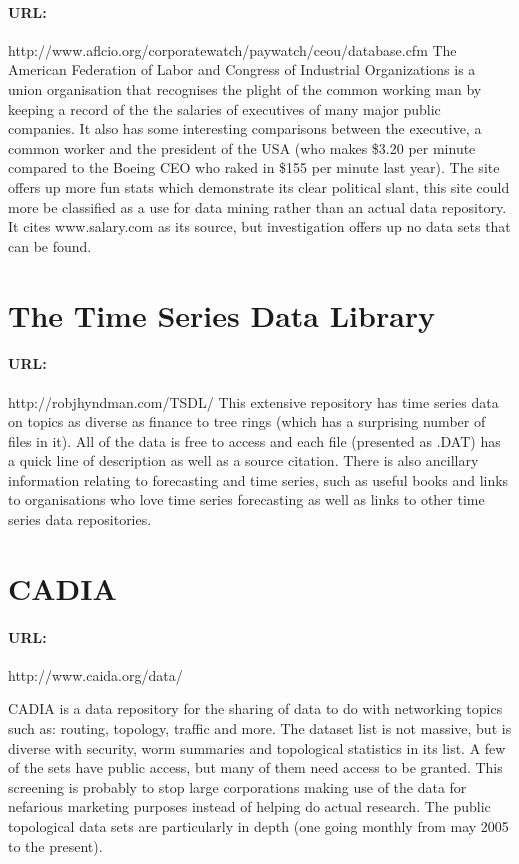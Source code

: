 \documentclass[10pt]{article}
\begin{document}
     \paragraph{URL:} http://www.aflcio.org/corporatewatch/paywatch/ceou/database.cfm\newline
     The American Federation of Labor and Congress of Industrial Organizations is a
     union organisation that recognises the plight of the common working man by keeping
     a record of the the salaries of executives of many major public companies.
     It also has some interesting comparisons between the executive, a common worker and
     the president of the USA (who makes \$3.20 per minute compared to the Boeing CEO 
     who raked in \$155 per minute last year). The site offers up more fun stats which
     demonstrate its clear political slant, this site could more be classified as a use      for data mining rather than an actual data repository. It cites www.salary.com as
     its source, but investigation offers up no data sets that can be found. 

  \section{The Time Series Data Library}
     \paragraph{URL:} http://robjhyndman.com/TSDL/\newline
     This extensive repository has time series data on topics as diverse as finance to
     tree rings (which has a surprising number of files in it). All of the data is
     free to access and each file (presented as .DAT) has a quick line of description
     as well as a source citation. There is also ancillary information relating to
     forecasting and time series, such as useful books and links to organisations
     who love time series forecasting as well as links to other time series
     data repositories. 
 \newpage      

  \section{CADIA}
    \paragraph{URL:} http://www.caida.org/data/\newline
   
    CADIA is a data repository for the sharing of data to do with networking topics
    such as: routing, topology, traffic and more. The dataset list is not massive, but
    is diverse with security, worm summaries and topological statistics in its list.
    A few of the sets have public access, but many of them need access to be granted.
    This screening is probably to stop large corporations making use of the data
    for nefarious marketing purposes instead of helping do actual research. The 
    public topological data sets are particularly in depth (one going monthly from may
    2005 to the present).   
 
\end{document}
